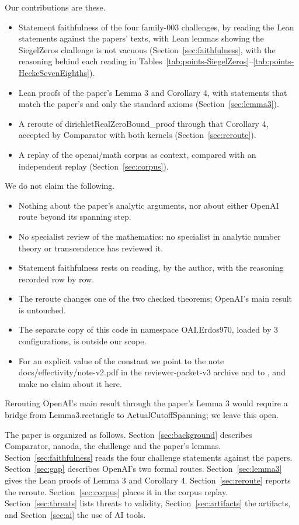 Our contributions are these.
\begin{itemize}
\item Statement faithfulness of the four family-003 challenges, by reading the Lean statements against the papers' texts, with Lean lemmas showing the SiegelZeros challenge is not vacuous (Section~\ref{sec:faithfulness}, with the reasoning behind each reading in Tables~\ref{tab:points-SiegelZeros}--\ref{tab:points-HeckeSevenEighths}).
\item Lean proofs of the paper's Lemma 3 and Corollary 4, with statements that match the paper's and only the standard axioms (Section~\ref{sec:lemma3}).
\item A reroute of dirichletRealZeroBound\_proof through that Corollary 4, accepted by Comparator with both kernels (Section~\ref{sec:reroute}).
\item A replay of the openai/math corpus as context, compared with an independent replay (Section~\ref{sec:corpus}).
\end{itemize}

We do not claim the following.
\begin{itemize}
\item Nothing about the paper's analytic arguments, nor about either OpenAI route beyond its spanning step.
\item No specialist review of the mathematics: no specialist in analytic number theory or transcendence has reviewed it.
\item Statement faithfulness rests on reading, by the author, with the reasoning recorded row by row.
\item The reroute changes one of the two checked theorems; OpenAI's main result is untouched.
\item The separate copy of this code in namespace OAI.Erdos970, loaded by 3 configurations, is outside our scope.
\item For an explicit value of the constant we point to the note docs/effectivity/note-v2.pdf in the reviewer-packet-v3 archive \cite{zenodo-23523697} and to \cite{arxiv-2610-15483}, and make no claim about it here.
\end{itemize}

Rerouting OpenAI's main result through the paper's Lemma 3 would require a bridge from Lemma3.rectangle to ActualCutoffSpanning; we leave this open.

The paper is organized as follows.
Section~\ref{sec:background} describes Comparator, nanoda, the challenge and the paper's lemmas.
Section~\ref{sec:faithfulness} reads the four challenge statements against the papers.
Section~\ref{sec:gap} describes OpenAI's two formal routes.
Section~\ref{sec:lemma3} gives the Lean proofs of Lemma 3 and Corollary 4.
Section~\ref{sec:reroute} reports the reroute.
Section~\ref{sec:corpus} places it in the corpus replay.
Section~\ref{sec:threats} lists threats to validity, Section~\ref{sec:artifacts} the artifacts, and Section~\ref{sec:ai} the use of AI tools.

